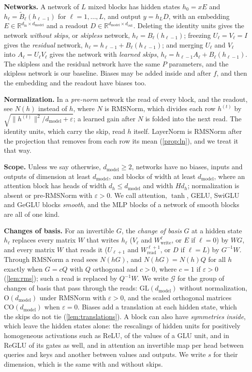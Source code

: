 \documentclass[10pt]{article}
\theoremstyle{definition}
\theoremstyle{remark}
\newcommand{\R}{\mathbb{R}}
\newcommand{\Wread}{W_{\mathrm{read}}}
\newcommand{\Wwrite}{W_{\mathrm{write}}}
\newcommand{\dm}{d_{\mathrm{model}}}
\newcommand{\GL}{\mathrm{GL}}
\newcommand{\Ort}{\mathrm{O}}
\newcommand{\CO}{\mathrm{CO}}
\newcommand{\G}{\mathcal{G}}
\newcommand{\norm}[1]{\lVert #1\rVert}
\newcommand{\para}[1]{\smallskip\noindent\textbf{#1}\hspace{0.5em}}
\begin{document}
\para{Networks.} A network of $L$ mixed blocks has hidden states $h_0 = xE$ and $h_\ell = \tilde B_\ell(h_{\ell-1})$ for $\ell = 1, \dots, L$, and output $y = h_LD$, with an embedding $E \in \R^{d_{\mathrm{in}}\times \dm}$ and a readout $D \in \R^{\dm\times d_{\mathrm{out}}}$. Deleting the identity units gives the network \emph{without skips}, or \emph{skipless} network, $h_\ell = B_\ell(h_{\ell-1})$; freezing $U_\ell = V_\ell = I$ gives the \emph{residual} network, $h_\ell = h_{\ell-1} + B_\ell(h_{\ell-1})$; and merging $U_\ell$ and $V_\ell$ into $A_\ell = U_\ell V_\ell$ gives the network with \emph{learned skips}, $h_\ell = h_{\ell-1}A_\ell + B_\ell(h_{\ell-1})$. The skipless and the residual network have the same $P$ parameters, and the skipless network is our baseline. Biases may be added inside and after $f$, and then the embedding and the readout have biases too.

\para{Normalization.} In a \emph{pre-norm} network the read of every block, and the readout, see $N(h)$ instead of $h$, where $N$ is RMSNorm, which divides each row $h^{(t)}$ by $\sqrt{\norm{h^{(t)}}^2/\dm + \varepsilon}$; a learned gain after $N$ is folded into the next read. The identity units, which carry the skip, read $h$ itself. LayerNorm is RMSNorm after the projection that removes from each row its mean (\cref{prop:ln}), and we treat it that way.

\para{Scope.} Unless we say otherwise, $\dm \ge 2$, networks have no biases, inputs and outputs of dimension at least $\dm$, and blocks of width at least $\dm$, where an attention block has heads of width $d_h \le \dm$ and width $Hd_h$; normalization is absent or pre-RMSNorm with $\varepsilon > 0$. We call attention, $\tanh$, GELU, SwiGLU and GeGLU blocks \emph{smooth}, and the MLP blocks of a network of smooth blocks are all of one kind.

\para{Changes of basis.} For an invertible $G$, the \emph{change of basis} $G$ at a hidden state $h_\ell$ replaces every matrix $W$ that writes $h_\ell$ ($V_\ell$ and $\Wwrite^{\ell}$, or $E$ if $\ell = 0$) by $WG$, and every matrix $W$ that reads it ($U_{\ell+1}$ and $\Wread^{\ell+1}$, or $D$ if $\ell = L$) by $G^{-1}W$. Through RMSNorm a read sees $N(hG)$, and $N(hG) = N(h)Q$ for all $h$ exactly when $G = cQ$ with $Q$ orthogonal and $c > 0$, where $c = 1$ if $\varepsilon > 0$ (\cref{lem:rms}); such a read is replaced by $Q^{-1}W$. We write $\G$ for the group of changes of basis that pass through the reads: $\GL(\dm)$ without normalization, $\Ort(\dm)$ under RMSNorm with $\varepsilon > 0$, and the scaled orthogonal matrices $\CO(\dm)$ when $\varepsilon = 0$. Biases add a translation at each hidden state, which the skips do not tie (\cref{lem:translations}). A block can also have \emph{symmetries inside}, which leave the hidden states alone: the rescalings of hidden units for positively homogeneous activations such as ReLU, of the values of a GLU unit, and in ReGLU of its gates as well, and in attention an invertible map per head between queries and keys and another between values and outputs. We write $s$ for their dimension, which is the same with and without skips.
\end{document}
